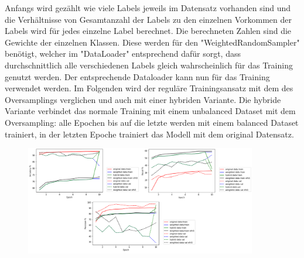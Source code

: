 \documentclass[12pt, a4paper]{article}
\begin{document}
Anfangs wird gezählt wie viele Labels jeweils im Datensatz vorhanden sind und die Verhältnisse von Gesamtanzahl der Labels zu den einzelnen Vorkommen der Labels wird für jedes einzelne Label berechnet. Die berechneten Zahlen sind die Gewichte der einzelnen Klassen. Diese werden für den "WeightedRandomSampler" benötigt, welcher im "DataLoader" entsprechend dafür sorgt, dass durchschnittlich alle verschiedenen Labels gleich wahrscheinlich für das Training genutzt werden. Der entsprechende Dataloader kann nun für das Training verwendet werden. Im Folgenden wird der reguläre Trainingsansatz mit dem des Oversamplings verglichen und auch mit einer hybriden Variante. Die hybride Variante verbindet das normale Training mit einem unbalanced Dataset mit dem Oversampling: alle Epochen bis auf die letzte werden mit einem balanced Dataset trainiert, in der letzten Epoche trainiert das Modell mit dem original Datensatz.
\begin{figure}[h]
\centering
\includegraphics[width=0.9\textwidth]{metrics-acc-recall-prec.png}
\end{figure}
\end{document}
